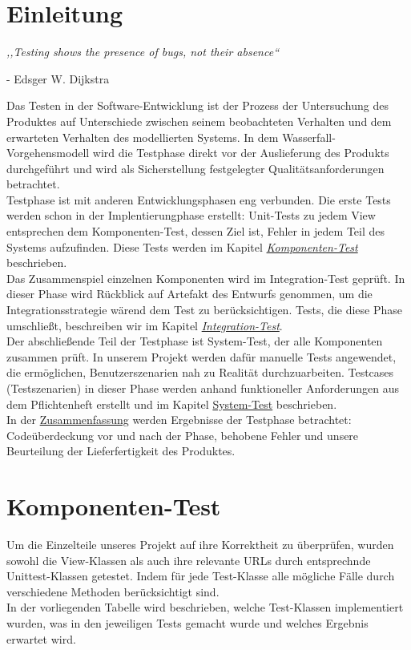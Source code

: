 \documentclass[parskip=full,11pt]{scrartcl}
\begin{document}
 \section{Einleitung}
\begin{center}
\textit{,,Testing shows the presence of bugs, not their absence``}
\end{center}
\begin{flushright}
- Edsger W. Dijkstra\\
\end{flushright}
Das Testen in der Software-Entwicklung ist der Prozess der Untersuchung des Produktes auf Unterschiede zwischen seinem beobachteten Verhalten und dem erwarteten Verhalten des modellierten Systems.
In dem Wasserfall-Vorgehensmodell wird die Testphase direkt vor der Auslieferung des Produkts durchgeführt und wird als Sicherstellung festgelegter Qualitätsanforderungen betrachtet.\\
Testphase ist mit anderen Entwicklungsphasen eng verbunden. Die erste Tests werden schon in der Implentierungphase erstellt: Unit-Tests zu jedem View entsprechen dem Komponenten-Test, dessen Ziel ist, Fehler in jedem Teil des Systems aufzufinden. Diese Tests werden im Kapitel \hyperref[komponententest]{\textit{Komponenten-Test}} beschrieben.\\
Das Zusammenspiel einzelnen Komponenten wird im Integration-Test gepr\"uft. In dieser Phase wird R\"uckblick auf Artefakt des Entwurfs genommen, um die Integrationsstrategie w\"arend dem Test zu ber\"ucksichtigen. Tests, die diese Phase umschließt, beschreiben wir im Kapitel \hyperref[integrationtest]{\textit{Integration-Test}}.\\
Der abschließende Teil der Testphase ist System-Test, der alle Komponenten zusammen pr\"uft. In unserem Projekt werden daf\"ur manuelle Tests angewendet, die erm\"oglichen, Benutzerszenarien nah zu Realit\"at durchzuarbeiten. Testcases (Testszenarien) in dieser Phase werden anhand funktioneller Anforderungen aus dem Pflichtenheft erstellt und im Kapitel \hyperref[systemtest]{System-Test} beschrieben.\\
In der \hyperref[zusammenfassung]{Zusammenfassung} werden Ergebnisse der Testphase betrachtet: Code\"uberdeckung vor und nach der Phase, behobene Fehler und unsere Beurteilung der Lieferfertigkeit des Produktes.
 \newpage
\section{Komponenten-Test} \label{komponententest}
Um die Einzelteile unseres Projekt auf ihre Korrektheit zu überprüfen, wurden sowohl die View-Klassen als auch ihre relevante URLs durch entsprechnde Unittest-Klassen getestet. Indem für jede Test-Klasse  alle mögliche Fälle durch verschiedene Methoden berücksichtigt sind.\\
In der vorliegenden Tabelle wird beschrieben, welche Test-Klassen implementiert wurden, was in den jeweiligen Tests gemacht wurde und welches Ergebnis erwartet wird.
\end{document}
